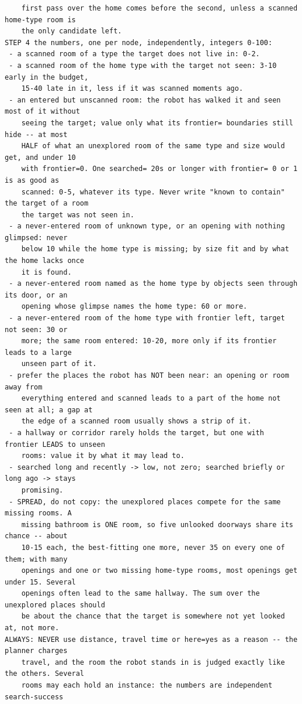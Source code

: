 \documentclass[10pt]{article}
\begin{document}
\begin{small}
\begin{verbatim}
    first pass over the home comes before the second, unless a scanned home-type room is
    the only candidate left.
STEP 4 the numbers, one per node, independently, integers 0-100:
 - a scanned room of a type the target does not live in: 0-2.
 - a scanned room of the home type with the target not seen: 3-10 early in the budget,
    15-40 late in it, less if it was scanned moments ago.
 - an entered but unscanned room: the robot has walked it and seen most of it without
    seeing the target; value only what its frontier= boundaries still hide -- at most
    HALF of what an unexplored room of the same type and size would get, and under 10
    with frontier=0. One searched= 20s or longer with frontier= 0 or 1 is as good as
    scanned: 0-5, whatever its type. Never write "known to contain" the target of a room
    the target was not seen in.
 - a never-entered room of unknown type, or an opening with nothing glimpsed: never
    below 10 while the home type is missing; by size fit and by what the home lacks once
    it is found.
 - a never-entered room named as the home type by objects seen through its door, or an
    opening whose glimpse names the home type: 60 or more.
 - a never-entered room of the home type with frontier left, target not seen: 30 or
    more; the same room entered: 10-20, more only if its frontier leads to a large
    unseen part of it.
 - prefer the places the robot has NOT been near: an opening or room away from
    everything entered and scanned leads to a part of the home not seen at all; a gap at
    the edge of a scanned room usually shows a strip of it.
 - a hallway or corridor rarely holds the target, but one with frontier LEADS to unseen
    rooms: value it by what it may lead to.
 - searched long and recently -> low, not zero; searched briefly or long ago -> stays
    promising.
 - SPREAD, do not copy: the unexplored places compete for the same missing rooms. A
    missing bathroom is ONE room, so five unlooked doorways share its chance -- about
    10-15 each, the best-fitting one more, never 35 on every one of them; with many
    openings and one or two missing home-type rooms, most openings get under 15. Several
    openings often lead to the same hallway. The sum over the unexplored places should
    be about the chance that the target is somewhere not yet looked at, not more.
ALWAYS: NEVER use distance, travel time or here=yes as a reason -- the planner charges
    travel, and the room the robot stands in is judged exactly like the others. Several
    rooms may each hold an instance: the numbers are independent search-success

\end{verbatim}
\end{small}
\end{document}
